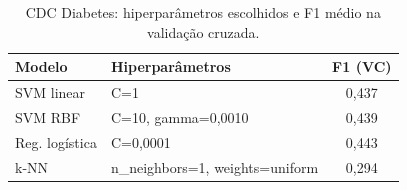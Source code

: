 \begin{table}[!t]
\centering
\caption{CDC Diabetes: hiperparâmetros escolhidos e F1 médio na validação cruzada.}
\label{tab:cdc_hiper}
\begin{tabular}{llc}
\hline
Modelo & Hiperparâmetros & F1 (VC) \\
\hline
SVM linear & C=1 & 0,437 \\
SVM RBF & C=10, gamma=0,0010 & 0,439 \\
Reg. logística & C=0,0001 & 0,443 \\
k-NN & n_neighbors=1, weights=uniform & 0,294 \\
\hline
\end{tabular}
\end{table}